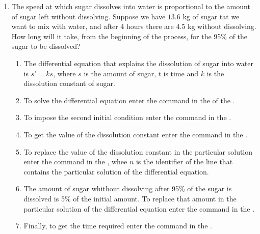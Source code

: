 \begin{enumerate}[leftmargin=*]
\item The speed at which sugar dissolves into water is proportional to the amount of sugar left without dissolving.
      Suppose we have $13.6$ kg of sugar tat we want to mix with water, and after 4 hours there are 4.5 kg without dissolving.
      How long will it take, from the beginning of the process, for the 95\% of the sugar to be dissolved?
      \begin{indication}
      \begin{enumerate}
      \item The differential equation that explains the dissolution of sugar into water is $s'=ks$, where $s$ is the amount of sugar, $t$ is time and $k$ is the dissolution constant of sugar.
      \item To solve the differential equation enter the command  in the  of the .
      \item To impose the second initial condition enter the command  in the .
      \item To get the value of the dissolution constant enter the command  in the .
      \item To replace the value of the dissolution constant in the particular solution enter the command   in the , whee $n$ is the identifier of the line that contains the particular solution of the differential equation.
      \item The amount of sugar whithout dissolving after 95\% of the sugar is dissolved  is 5\% of the initial amount.
            To replace that amount in the particular solution of the differential equation enter the command  in the .
      \item Finally, to get the time required enter the command  in the .
      \end{enumerate}
      \end{indication}

\end{enumerate}


